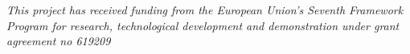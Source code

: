 \documentclass{beamer}
\begin{document}


\begin{frame} \frametitle{} 
{\it This project has received funding from the European Union's Seventh Framework Program for research, technological development and demonstration under grant agreement no 619209}
\end{frame}
\end{document}
